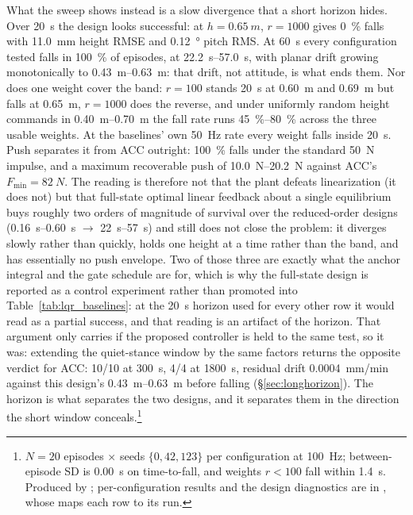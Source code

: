 \documentclass[conference]{IEEEtran}
\begin{document}
What the sweep shows instead is a slow divergence that a short horizon hides. Over \SI{20}{s} the design looks successful: at $h{=}\SI{0.65}{m}$, $r{=}1000$ gives \SI{0}{\percent} falls with \SI{11.0}{mm} height RMSE and \SI{0.12}{\degree} pitch RMS. At \SI{60}{s} every configuration tested falls in \SI{100}{\percent} of episodes, at \SIrange{22.2}{57.0}{s}, with planar drift growing monotonically to \SIrange{0.43}{0.63}{m}: that drift, not attitude, is what ends them. Nor does one weight cover the band: $r{=}100$ stands \SI{20}{s} at \SI{0.60}{m} and \SI{0.69}{m} but falls at \SI{0.65}{m}, $r{=}1000$ does the reverse, and under uniformly random height commands in \SIrange{0.40}{0.70}{m} the fall rate runs \SIrange{45}{80}{\percent} across the three usable weights. At the baselines' own \SI{50}{Hz} rate every weight falls inside \SI{20}{s}. Push separates it from ACC outright: \SI{100}{\percent} falls under the standard \SI{50}{N} impulse, and a maximum recoverable push of \SIrange{10.0}{20.2}{N} against ACC's $F_{\min}{=}\SI{82}{N}$. The reading is therefore not that the plant defeats linearization (it does not) but that full-state optimal linear feedback about a single equilibrium buys roughly two orders of magnitude of survival over the reduced-order designs (\SIrange{0.16}{0.60}{s} $\rightarrow$ \SIrange{22}{57}{s}) and still does not close the problem: it diverges slowly rather than quickly, holds one height at a time rather than the band, and has essentially no push envelope. Two of those three are exactly what the anchor integral and the gate schedule are for, which is why the full-state design is reported as a control experiment rather than promoted into Table~\ref{tab:lqr_baselines}: at the \SI{20}{s} horizon used for every other row it would read as a partial success, and that reading is an artifact of the horizon. That argument only carries if the proposed controller is held to the same test, so it was: extending the quiet-stance window by the same factors returns the opposite verdict for ACC: \num{10}/\num{10} at \SI{300}{s}, \num{4}/\num{4} at \SI{1800}{s}, residual drift \SI{0.0004}{mm/min} against this design's \SIrange{0.43}{0.63}{m} before falling (\S\ref{sec:longhorizon}). The horizon is what separates the two designs, and it separates them in the direction the short window conceals.\footnote{$N{=}20$ episodes $\times$ seeds $\{0,42,123\}$ per configuration at \SI{100}{Hz}; between-episode SD is \SI{0.00}{s} on time-to-fall, and weights $r{<}100$ fall within \SI{1.4}{s}. Produced by ; per-configuration results and the design diagnostics are in , whose  maps each row to its run.}
\end{document}
